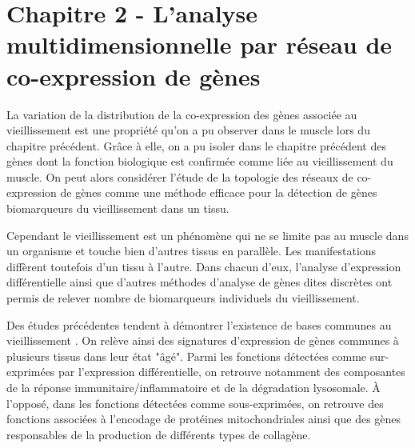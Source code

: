 \chapter{Chapitre 2 - L'analyse multidimensionnelle par réseau de co-expression de gènes}
\label{chapter:multidim}


La variation de la distribution de la co-expression des gènes associée au vieillissement est une propriété qu'on a pu observer dans le muscle lors du chapitre précédent. Grâce à elle, on a pu isoler dans le chapitre précédent des gènes dont la fonction biologique est confirmée comme liée au vieillissement du muscle. On peut alors considérer l'étude de la topologie des réseaux de co-expression de gènes comme une méthode efficace pour la détection de gènes biomarqueurs du vieillissement dans un tissu. 

Cependant le vieillissement est un phénomène qui ne se limite pas au muscle dans un organisme et touche bien d'autres tissus en parallèle. Les manifestations diffèrent toutefois d'un tissu à l'autre.
Dans chacun d'eux, l'analyse d'expression différentielle ainsi que d'autres méthodes d'analyse de gènes dites discrètes \cite{Barabasi2004} ont permis de relever nombre de biomarqueurs individuels du vieillissement. 



Des études précédentes tendent à démontrer l'existence de bases communes au vieillissement \cite{DeMagalhaes2009a}. On relève ainsi des signatures d'expression de gènes communes à plusieurs tissus dans leur état "âgé". Parmi les fonctions détectées comme sur-exprimées par l'expression différentielle, on retrouve notamment des composantes de la réponse immunitaire/inflammatoire et de la dégradation lysosomale. À l'opposé, dans les fonctions détectées comme sous-exprimées, on retrouve des fonctions associées à l'encodage de protéines mitochondriales ainsi que des gènes responsables de la production de différents types de collagène.

